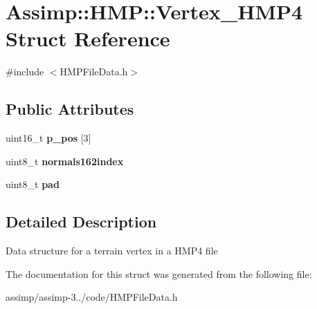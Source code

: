 \hypertarget{struct_assimp_1_1_h_m_p_1_1_vertex___h_m_p4}{\section{Assimp\+:\+:H\+M\+P\+:\+:Vertex\+\_\+\+H\+M\+P4 Struct Reference}
\label{struct_assimp_1_1_h_m_p_1_1_vertex___h_m_p4}
}


{\ttfamily \#include $<$H\+M\+P\+File\+Data.\+h$>$}

\subsection*{Public Attributes}
\begin{DoxyCompactItemize}
\item 
\hypertarget{struct_assimp_1_1_h_m_p_1_1_vertex___h_m_p4_a72698d80a7bd899085c936278976c0b7}{uint16\+\_\+t {\bfseries p\+\_\+pos} \mbox{[}3\mbox{]}}\label{struct_assimp_1_1_h_m_p_1_1_vertex___h_m_p4_a72698d80a7bd899085c936278976c0b7}

\item 
\hypertarget{struct_assimp_1_1_h_m_p_1_1_vertex___h_m_p4_ad894695f3e09369d1af9c60135e0ed74}{uint8\+\_\+t {\bfseries normals162index}}\label{struct_assimp_1_1_h_m_p_1_1_vertex___h_m_p4_ad894695f3e09369d1af9c60135e0ed74}

\item 
\hypertarget{struct_assimp_1_1_h_m_p_1_1_vertex___h_m_p4_a3d2e8aa6aeb89bf5f5ac68bfc85ed3b5}{uint8\+\_\+t {\bfseries pad}}\label{struct_assimp_1_1_h_m_p_1_1_vertex___h_m_p4_a3d2e8aa6aeb89bf5f5ac68bfc85ed3b5}

\end{DoxyCompactItemize}


\subsection{Detailed Description}
Data structure for a terrain vertex in a H\+M\+P4 file 

The documentation for this struct was generated from the following file\+:\begin{DoxyCompactItemize}
\item 
assimp/assimp-\/3../code/H\+M\+P\+File\+Data.\+h\end{DoxyCompactItemize}
